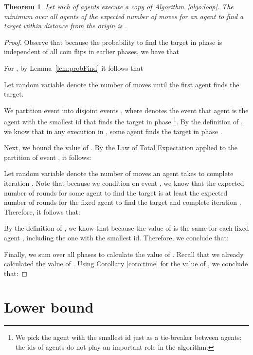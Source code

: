 \documentclass[11pt]{article}
\newtheorem{theorem}{Theorem}[section]
\begin{document}
\begin{theorem}\label{theorem:upper}
Let each of  agents execute a copy of Algorithm~\ref{algo:loop}. The minimum over all agents of the expected number of moves for an agent to find a target within distance  from the origin is .
\end{theorem}
\begin{proof}
Observe that because the probability to find the target in phase  is independent of all coin flips in earlier phases, we have that

For , by Lemma~\ref{lem:probFind} it follows that


Let random variable  denote the number of moves until the first agent finds the target.



We partition event  into disjoint events , where  denotes the event that agent  is the agent with the smallest id that finds the target in phase \footnote{We pick the agent with the smallest id just as a tie-breaker between agents; the ids of agents do not play an important role in the algorithm.}. By the definition of , we know that in any execution in , some agent finds the target in phase .

Next, we bound the value of . By the Law of Total Expectation applied to the partition of event , it follows:



Let random variable  denote the number of moves an agent  takes to complete iteration . Note that because we condition on event , we know that the expected number of rounds for some agent to find the target is at least the expected number of rounds for the fixed agent  to find the target and complete iteration . Therefore, it follows that: 



By the definition of , we know that  because the value of  is the same for each fixed agent , including the one with the smallest id. Therefore, we conclude that:


Finally, we sum over all phases to calculate the value of . Recall that we already calculated the value of . Using Corollary \ref{coro:time} for the value of , we conclude that:

\vspace*{-1.35cm}

\qedhere
\end{proof}


\section{Lower bound}
\label{sec:lower}
\end{document}
